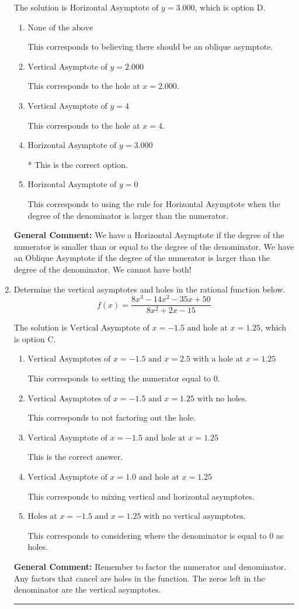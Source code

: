 \documentclass{extbook}[14pt]
\newcommand{\litem}[1]{\item #1

\rule{\textwidth}{0.4pt}}
\begin{document}
\begin{enumerate}
{The solution is \( \text{Horizontal Asymptote of } y = 3.000  \), which is option D.\begin{enumerate}[label=\Alph*.]
\item \( \text{None of the above} \)

This corresponds to believing there should be an oblique asymptote.
\item \( \text{Vertical Asymptote of } y = 2.000  \)

This corresponds to the hole at $x = 2.000$.
\item \( \text{Vertical Asymptote of } y = 4  \)

This corresponds to the hole at $x = 4$.
\item \( \text{Horizontal Asymptote of } y = 3.000  \)

* This is the correct option.
\item \( \text{Horizontal Asymptote of } y = 0  \)

This corresponds to using the rule for Horizontal Asymptote when the degree of the denominator is larger than the numerator.
\end{enumerate}

\textbf{General Comment:} We have a Horizontal Asymptote if the degree of the numerator is smaller than or equal to the degree of the denominator. We have an Oblique Asymptote if the degree of the numerator is larger than the degree of the denominator. We cannot have both!
}
\litem{
Determine the vertical asymptotes and holes in the rational function below.
\[ f(x) = \frac{8x^{3} -14 x^{2} -35 x + 50}{8x^{2} +2 x -15} \]

The solution is \( \text{Vertical Asymptote of } x = -1.5 \text{ and hole at } x = 1.25 \), which is option C.\begin{enumerate}[label=\Alph*.]
\item \( \text{Vertical Asymptotes of } x = -1.5 \text{ and } x = 2.5 \text{ with a hole at } x = 1.25 \)

This corresponds to setting the numerator equal to 0.
\item \( \text{Vertical Asymptotes of } x = -1.5 \text{ and } x = 1.25 \text{ with no holes.} \)

This corresponds to not factoring out the hole.
\item \( \text{Vertical Asymptote of } x = -1.5 \text{ and hole at } x = 1.25 \)

This is the correct answer.
\item \( \text{Vertical Asymptote of } x = 1.0 \text{ and hole at } x = 1.25 \)

This corresponds to mixing vertical and horizontal asymptotes.
\item \( \text{Holes at } x = -1.5 \text{ and } x = 1.25 \text{ with no vertical asymptotes.} \)

This corresponds to considering where the denominator is equal to 0 as holes.
\end{enumerate}

\textbf{General Comment:} Remember to factor the numerator and denominator. Any factors that cancel are holes in the function. The zeros left in the denominator are the vertical asymptotes.
}
\end{enumerate}
\end{document}
